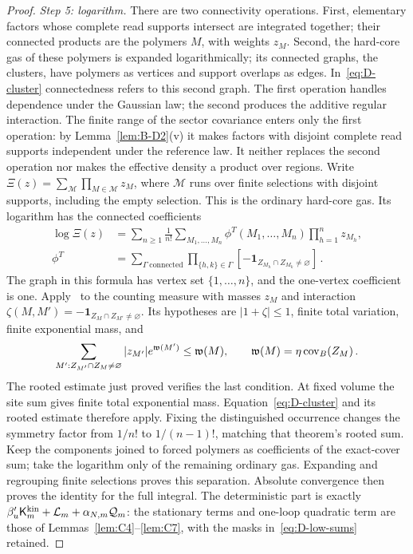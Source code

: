 \begin{proof}
\emph{Step 5: logarithm.} There are two connectivity operations. First, elementary factors whose complete read supports intersect are integrated together; their connected products are the polymers $M$, with weights $z_M$. Second, the hard-core gas of these polymers is expanded logarithmically; its connected graphs, the clusters, have polymers as vertices and support overlaps as edges. In~\eqref{eq:D-cluster} connectedness refers to this second graph. The first operation handles dependence under the Gaussian law; the second produces the additive regular interaction. The finite range of the sector covariance enters only the first operation: by Lemma~\ref{lem:B-D2}(v) it makes factors with disjoint complete read supports independent under the reference law. It neither replaces the second operation nor makes the effective density a product over regions. Write $\Xi(z)=\sum_{\mathcal M}\prod_{M\in\mathcal M}z_M$, where $\mathcal M$ runs over finite selections with disjoint supports, including the empty selection. This is the ordinary hard-core gas. Its logarithm has the connected coefficients
\begin{equation}\label{eq:D-cluster}
\begin{aligned}
\log\Xi(z)&=\sum_{n\ge1}\frac1{n!}
\sum_{M_1,\ldots,M_n}\phi^T(M_1,\ldots,M_n)
\prod_{h=1}^nz_{M_h},\\
\phi^T&=\sum_{\Gamma\ \text{connected}}\prod_{\{h,k\}\in\Gamma}
[-\mathbf1_{Z_{M_h}\cap Z_{M_k}\ne\varnothing}]\,.
\end{aligned}
\end{equation}
The graph in this formula has vertex set $\{1,\ldots,n\}$, and the one-vertex coefficient is one. Apply~\cite[Theorem~1, equations~(3)--(4)]{Ueltschi2004} to the counting measure with masses $z_M$ and interaction $\zeta(M,M')=-\mathbf1_{Z_M\cap Z_{M'}\ne\varnothing}$. Its hypotheses are $|1+\zeta|\le1$, finite total variation, finite exponential mass, and
\begin{equation*}
\sum_{M':Z_{M'}\cap Z_M\ne\varnothing}|z_{M'}|e^{\mathfrak w(M')}\le \mathfrak w(M),
\qquad \mathfrak w(M)=\eta\operatorname{cov}_B(Z_M)\,.
\end{equation*}
The rooted estimate just proved verifies the last condition. At fixed volume the site sum gives finite total exponential mass. Equation~\eqref{eq:D-cluster} and its rooted estimate therefore apply. Fixing the distinguished occurrence changes the symmetry factor from $1/n!$ to $1/(n-1)!$, matching that theorem's rooted sum. Keep the components joined to forced polymers as coefficients of the exact-cover sum; take the logarithm only of the remaining ordinary gas. Expanding and regrouping finite selections proves this separation. Absolute convergence then proves the identity for the full integral. The deterministic part is exactly $\beta'_u\mathsf K_m^{\rm kin}+\mathcal L_m+\alpha_{N,m}\mathcal Q_m$: the stationary terms and one-loop quadratic term are those of Lemmas~\ref{lem:C4}--\ref{lem:C7}, with the masks in~\eqref{eq:D-low-sums} retained.


\end{proof}
